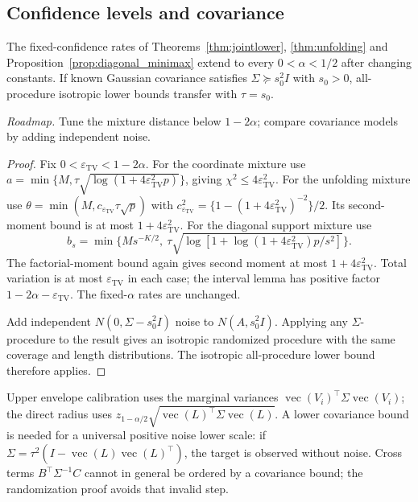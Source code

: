 \subsection{Confidence levels and covariance}
\begin{proposition}\label{prop:levels}
The fixed-confidence rates of Theorems~\ref{thm:jointlower}, \ref{thm:unfolding}
and Proposition~\ref{prop:diagonal_minimax} extend to every $0<\alpha<1/2$
after changing constants.
If known Gaussian covariance satisfies $\Sigma\succeq s_0^2I$ with $s_0>0$,
all-procedure isotropic lower bounds transfer with $\tau=s_0$.
\end{proposition}
\noindent\emph{Roadmap.} Tune the mixture distance below $1-2\alpha$; compare covariance models by adding independent noise.
\begin{proof}
Fix $0<\varepsilon_{\mathrm{TV}}<1-2\alpha$. For the coordinate mixture use
$a=\min\{M,\tau\sqrt{\log(1+4\varepsilon_{\mathrm{TV}}^2p)}\}$, giving $\chi^2\le4\varepsilon_{\mathrm{TV}}^2$.
For the unfolding mixture use $\theta=\min(M,c_{\varepsilon_{\mathrm{TV}}}\tau\sqrt p)$ with
$c_{\varepsilon_{\mathrm{TV}}}^2=\{1-(1+4\varepsilon_{\mathrm{TV}}^2)^{-2}\}/2$.
Its second-moment bound is at most $1+4\varepsilon_{\mathrm{TV}}^2$.
For the diagonal support mixture use
\[
 b_s=\min\{Ms^{-K/2},\
 \tau\sqrt{\log[1+\log(1+4\varepsilon_{\mathrm{TV}}^2)p/s^2]}\}.
\]
The factorial-moment bound again gives second moment at most $1+4\varepsilon_{\mathrm{TV}}^2$.
Total variation is at most $\varepsilon_{\mathrm{TV}}$ in each case; the interval lemma has positive factor $1-2\alpha-\varepsilon_{\mathrm{TV}}$. The fixed-$\alpha$ rates are unchanged.

Add independent $N(0,\Sigma-s_0^2I)$ noise to $N(A,s_0^2I)$.
Applying any $\Sigma$-procedure to the result gives an isotropic randomized procedure with the same coverage and length distributions.
The isotropic all-procedure lower bound therefore applies.
\end{proof}
Upper envelope calibration uses the marginal variances
$\operatorname{vec}(V_i)^\top\Sigma\operatorname{vec}(V_i)$;
the direct radius uses
$z_{1-\alpha/2}\sqrt{\operatorname{vec}(L)^\top\Sigma\operatorname{vec}(L)}$.
A lower covariance bound is needed for a universal positive noise lower scale:
if $\Sigma=\tau^2(I-\operatorname{vec}(L)\operatorname{vec}(L)^\top)$,
the target is observed without noise.
Cross terms $B^\top\Sigma^{-1}C$ cannot in general be ordered by a covariance bound; the randomization proof avoids that invalid step.
